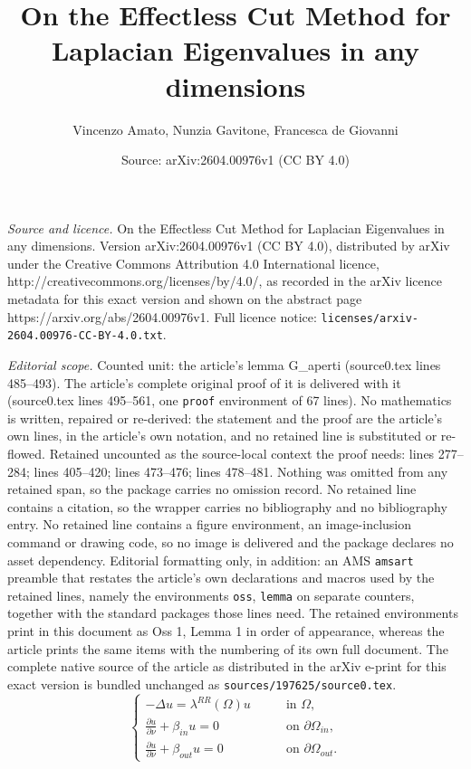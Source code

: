 \documentclass[10pt,a4paper]{amsart}
\title{On the Effectless Cut Method for Laplacian Eigenvalues in any dimensions}
\author{Vincenzo Amato, Nunzia Gavitone, Francesca de Giovanni}
\date{Source: arXiv:2604.00976v1 (CC BY 4.0)}
\begin{document}
\maketitle

\noindent\emph{Source and licence.} On the Effectless Cut Method for Laplacian Eigenvalues in any dimensions. Version arXiv:2604.00976v1 (CC BY 4.0), distributed by arXiv under the Creative Commons Attribution 4.0 International licence, http://creativecommons.org/licenses/by/4.0/, as recorded in the arXiv licence metadata for this exact version and shown on the abstract page https://arxiv.org/abs/2604.00976v1. Full licence notice: \texttt{licenses/arxiv-2604.00976-CC-BY-4.0.txt}.\par\smallskip

\noindent\textit{Editorial scope.} Counted unit: the article's lemma G\_aperti (source0.tex lines 485--493). The article's complete original proof of it is delivered with it (source0.tex lines 495--561, one \texttt{proof} environment of 67 lines). No mathematics is written, repaired or re-derived: the statement and the proof are the article's own lines, in the article's own notation, and no retained line is substituted or re-flowed.  Retained uncounted as the source-local context the proof needs: lines 277--284; lines 405--420; lines 473--476; lines 478--481.  Nothing was omitted from any retained span, so the package carries no omission record.  No retained line contains a citation, so the wrapper carries no bibliography and no bibliography entry.  No retained line contains a figure environment, an image-inclusion command or drawing code, so no image is delivered and the package declares no asset dependency.  Editorial formatting only, in addition: an AMS \texttt{amsart} preamble that restates the article's own declarations and macros used by the retained lines, namely the environments \texttt{oss}, \texttt{lemma} on separate counters, together with the standard packages those lines need.  The retained environments print in this document as Oss 1, Lemma 1 in order of appearance, whereas the article prints the same items with the numbering of its own full document.  The complete native source of the article as distributed in the arXiv e-print for this exact version is bundled unchanged as \texttt{sources/197625/source0.tex}.
\begin{equation}
    \label{probprinc}
    \begin{cases}
    -\Delta u = \lambda^{RR}(\Omega)u \qquad & \text{in } \Omega, \\
     \displaystyle \frac{\partial u }{\partial \nu} + \beta_{in} u = 0  \qquad & \text{on } \partial\Omega_{in},\\
    \displaystyle \frac{\partial u }{\partial \nu} + \beta_{out} u = 0  \qquad & \text{on } \partial\Omega_{out}.
\end{cases}
\end{equation}
\end{document}
